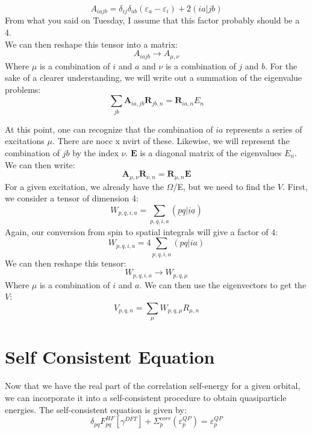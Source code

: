 \documentclass[12pt]{article}
\begin{document}
\begin{equation}
    A_{iajb}=\delta _{ij} \delta _{ab} \left(\varepsilon _{a}-\varepsilon _{i}\right) + 2(ia|jb)
\end{equation}
From what you said on Tuesday, I assume that this factor probably should be a 4.\\
We can then reshape this tensor into a matrix:
\begin{equation}
    A_{iajb} \rightarrow A_{\mu ,\nu }
\end{equation}
Where $\mu$ is a combination of $i$ and $a$ and $\nu$ is a combination of $j$ and $b$.
For the sake of a clearer understanding, we will write out a summation of the eigenvalue problems:
\begin{equation}
    \sum_{jb} \textbf{A}_{ia,jb} \textbf{R}_{jb,n} = \textbf{R}_{ia,n} E_n
\end{equation}


At this point, one can recognize that the combination of $ia$ represents a series of excitations $\mu $. There are nocc x nvirt of these. Likewise, we will represent the combination of $jb$ by the index $\nu $. $\textbf{E}$ is a diagonal matrix of the eigenvalues $E_{n}$. We can then write:
\begin{equation}
    \textbf{A}_{\mu ,\nu } \textbf{R}_{\nu, n} = \textbf{R}_{\mu ,n} \textbf{E}
\end{equation}
For a given excitation, we already have the $\Omega $/E, but we need to find the $V$.
First, we consider a tensor of dimension 4:
\begin{equation}
    W_{p,q,i,a} = \sum_{\underline{p,q,i,a}} (\underline{p} \underline{q} | \underline{i} \underline{a} )
\end{equation}
Again, our conversion from spin to spatial integrals will give a factor of $4$:
\begin{equation}
    W_{p,q,i,a} = 4 \sum_{p,q,i,a} (pq|ia)
\end{equation}
We can then reshape this tensor:
\begin{equation}
    W_{p,q,i,a} \rightarrow W_{p,q, \mu }
\end{equation}
Where $\mu$ is a combination of $i$ and $a$. We can then use the eigenvectors to get the $V$:
\begin{equation}
    V_{p,q,n} = \sum_{\mu } W_{p,q,\mu } R_{\mu ,n }
\end{equation}
\section{Self Consistent Equation}
Now that we have the real part of the correlation self-energy for a given orbital, we can incorporate it into a self-consistent procedure to obtain quasiparticle energies. The self-consistent equation is given by:
\begin{equation}
    \delta_{pq}F_{pq}^{HF}[\gamma^{DFT}] + \Sigma_{p}^{corr}(\varepsilon_{p}^{QP}) = \varepsilon_{p}^{QP}
\end{equation}
\end{document}
